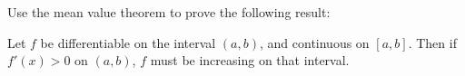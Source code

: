 \documentclass{ximera}
\author{Steven Gubkin}
\begin{document}
\begin{exercise}



Use the mean value theorem to prove the following result:

\begin{theorem}
	Let $f$ be differentiable on the interval $(a,b)$, and continuous on $[a,b]$. Then if $f'(x)>0$ on $(a,b)$, $f$ must be increasing on that interval.
\end{theorem}

\end{exercise}
\end{document}
